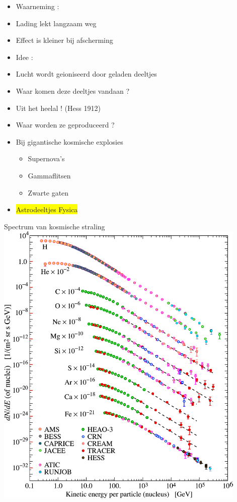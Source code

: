 \newpage

\begin{itemize}
\item Waarneming :
\item[] Lading lekt langzaam weg
\item[] Effect is kleiner bij afscherming
\item Idee :
\item[] Lucht wordt geioniseerd door geladen deeltjes
\item Waar komen deze deeltjes vandaan ?
\item[] Uit het heelal ! (Hess 1912)
\item Waar worden ze geproduceerd ?
\item[] Bij gigantische kosmische explosies
\begin{itemize}
\item Supernova's
\item Gammaflitsen
\item Zwarte gaten
\end{itemize}
\item[] \begin{center}\colorbox{yellow}{Astrodeeltjes Fysica}\end{center}
\end{itemize}

\Tr
\begin{center}
{\blue Spectrum van kosmische straling}\\[5mm]
\includegraphics[keepaspectratio,height=14cm]{cr-low-e}
\end{center}

